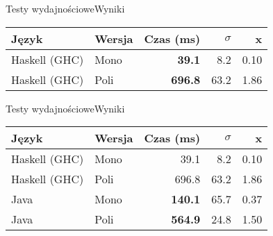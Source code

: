 \documentclass{beamer}
\begin{document}
\begin{frame}[fragile]{Testy wydajnościowe}{Wyniki}
    
\begin{center}
\begin{table}
\begin{tabular}{|| l | l | r | r | r ||} 

 \hline
 Język & Wersja & Czas (ms) & $\sigma$ & x \\ 
 \hline\hline
 Haskell (GHC)        & Mono & \textbf{39.1}  & 8.2  & 0.10 \\ 
 Haskell (GHC)        & Poli & \textbf{696.8} & 63.2 & 1.86 \\ 
 \hline
\end{tabular}
\end{table}
\end{center}
\end{frame}

\begin{frame}[fragile]{Testy wydajnościowe}{Wyniki}
    
\begin{center}
\begin{table}
\begin{tabular}{|| l | l | r | r | r ||} 

 \hline
 Język & Wersja & Czas (ms) & $\sigma$ & x \\ 
 \hline\hline
 Haskell (GHC)        & Mono & 39.1  & 8.2  & 0.10 \\ 
 Haskell (GHC)        & Poli & 696.8 & 63.2 & 1.86 \\ 
 Java                 & Mono & \textbf{140.1} & 65.7 & 0.37 \\ 
 Java                 & Poli & \textbf{564.9} & 24.8 & 1.50 \\ 
 \hline
\end{tabular}
\end{table}
\end{center}
\end{frame}
\end{document}
